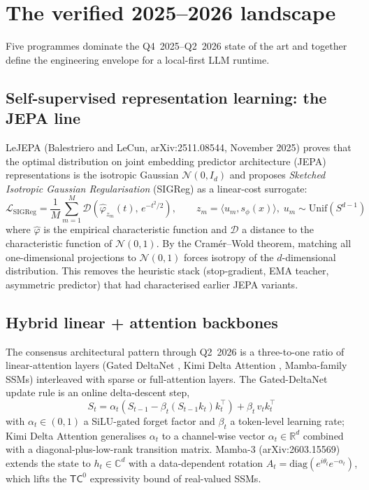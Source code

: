 \documentclass[10pt,a4paper]{article}
\theoremstyle{remark}
\begin{document}
\section{The verified 2025--2026 landscape}
\label{sec:sota}

Five programmes dominate the Q4~2025--Q2~2026 state of the art and
together define the engineering envelope for a local-first LLM
runtime.

\subsection{Self-supervised representation learning: the JEPA line}
\label{sec:jepa}

LeJEPA (Balestriero and LeCun, arXiv:2511.08544, November 2025)
\cite{LeJEPA2025} proves that the optimal distribution on joint
embedding predictor architecture (JEPA) representations is the
isotropic Gaussian $\mathcal{N}(0, I_d)$ and proposes
\emph{Sketched Isotropic Gaussian Regularisation} (SIGReg) as a
linear-cost surrogate:
\begin{equation}
 \mathcal{L}_{\mathrm{SIGReg}} = \frac{1}{M} \sum_{m=1}^{M}
 \mathcal{D}\!\left( \hat\varphi_{z_m}(t),\, e^{-t^2/2} \right),
 \qquad z_m = \langle u_m, s_\phi(x) \rangle, \;
 u_m \sim \mathrm{Unif}(S^{d-1})
 \label{eq:sigreg}
\end{equation}
where $\hat\varphi$ is the empirical characteristic function and
$\mathcal{D}$ a distance to the characteristic function of
$\mathcal{N}(0,1)$. By the Cram\'er--Wold theorem, matching all
one-dimensional projections to $\mathcal{N}(0,1)$ forces isotropy of
the $d$-dimensional distribution. This removes the heuristic
stack (stop-gradient, EMA teacher, asymmetric predictor) that had
characterised earlier JEPA variants.

\subsection{Hybrid linear + attention backbones}
\label{sec:backbone}

The consensus architectural pattern through Q2~2026 is a
three-to-one ratio of linear-attention layers (Gated DeltaNet
\cite{GatedDeltaNet2025}, Kimi Delta Attention
\cite{KimiLinear2025}, Mamba-family SSMs) interleaved with sparse
or full-attention layers. The Gated-DeltaNet update rule is an
online delta-descent step,
\begin{equation}
 S_t = \alpha_t \left( S_{t-1} - \beta_t (S_{t-1} k_t) k_t^{\top} \right)
 + \beta_t\, v_t k_t^{\top}
 \label{eq:gdn}
\end{equation}
with $\alpha_t \in (0,1)$ a SiLU-gated forget factor and $\beta_t$ a
token-level learning rate; Kimi Delta Attention generalises
$\alpha_t$ to a channel-wise vector $\alpha_t \in \mathbb{R}^d$
combined with a diagonal-plus-low-rank transition matrix. Mamba-3
(arXiv:2603.15569) extends the state to $h_t \in \mathbb{C}^d$ with a
data-dependent rotation $A_t = \mathrm{diag}(e^{i\theta_t} e^{-\alpha_t})$,
which lifts the $\mathsf{TC}^0$ expressivity bound of real-valued
SSMs.
\end{document}
